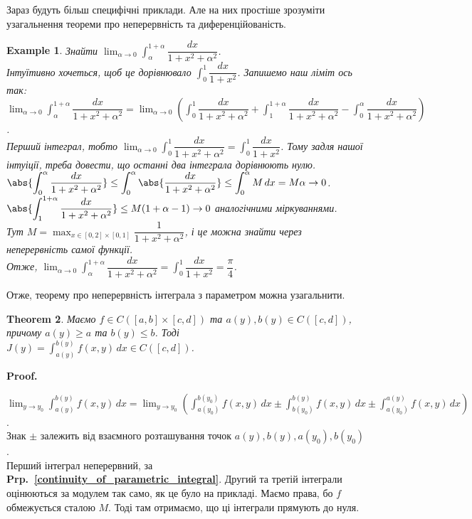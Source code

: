\documentclass[a4paper, 10pt]{article}
\makeatletter
\def\huge{\displaystyle}
\theoremstyle{theoremdd}
\newtheorem{theorem}{Theorem}[subsection]
\theoremstyle{theoremdd}
\theoremstyle{theoremdd}
\theoremstyle{theoremdd}
\theoremstyle{theoremdd}
\newtheorem{example}[theorem]{Example}
\theoremstyle{theoremdd}
\theoremstyle{theoremdd}
\theoremstyle{theoremdd}
\theoremstyle{theoremdd}
\newcommand\prpref[1]{\textbf{Prp.~\ref{#1}}}
\renewenvironment{proof}[1][Proof.\\]{\par
\pushQED{\hfill \qed}%
\normalfont \topsep6\p@\@plus6\p@\relax
\trivlist
\item\relax
{\bfseries
#1\@addpunct{.}}\hspace\labelsep\ignorespaces
}{%
\popQED\endtrivlist\@endpefalse
}
\makeatother
\begin{document}
Зараз будуть більш специфічні приклади. Але на них простіше зрозуміти узагальнення теореми про неперервність та диференційованість.
\begin{example}
Знайти $\huge\lim_{\alpha \to 0} \int_{\alpha}^{1+\alpha} \dfrac{dx}{1+x^2+\alpha^2}$.\\
Інтуїтивно хочеться, щоб це дорівнювало $\huge\int_0^1 \dfrac{dx}{1+x^2}$. Запишемо наш ліміт ось так:\\
$\huge\lim_{\alpha \to 0} \int_{\alpha}^{1+\alpha} \dfrac{dx}{1+x^2+\alpha^2} = \lim_{\alpha \to 0} \left( \int_0^1 \dfrac{dx}{1+x^2+\alpha^2} + \int_1^{1+\alpha} \dfrac{dx}{1+x^2+\alpha^2} - \int_0^{\alpha} \dfrac{dx}{1+x^2+\alpha^2} \right)$.\\
Перший інтеграл, тобто $\huge \lim_{\alpha \to 0} \int_0^1 \dfrac{dx}{1+x^2+\alpha^2} = \int_0^1 \dfrac{dx}{1+x^2}$. Тому задля нашої інтуіції, треба довести, що останні два інтеграла дорівнюють нулю.\\
$\huge \abs{\int_0^\alpha \dfrac{dx}{1+x^2+\alpha^2}} \leq \int_0^\alpha \abs{\dfrac{dx}{1+x^2+\alpha^2}} \leq \int_0^\alpha M\,dx = M \alpha \to 0$.\\
$\huge \abs{\int_1^{1+\alpha} \dfrac{dx}{1+x^2+\alpha^2}} \leq M (1+\alpha-1) \to 0$ аналогічними міркуваннями.\\
Тут $M = \huge\max_{x \in [0,2] \times [0,1]} \dfrac{1}{1+x^2+\alpha^2}$, і це можна знайти через неперервність самої функції.\\
Отже, $\huge\lim_{\alpha \to 0} \int_\alpha^{1+\alpha} \dfrac{dx}{1+x^2+\alpha^2} = \int_0^1 \dfrac{dx}{1+x^2} = \dfrac{\pi}{4}$.
\end{example}

Отже, теорему про неперервність інтеграла з параметром можна узагальнити.

\begin{theorem}
Маємо $f \in C([a,b] \times [c,d])$ та $a(y),b(y) \in C([c,d])$, причому $a(y) \geq a$ та $b(y) \leq b$. Тоді $J(y) = \huge\int_{a(y)}^{b(y)} f(x,y)\,dx \in C([c,d])$.
\end{theorem}

\begin{proof}
$\displaystyle\lim_{y \to y_0} \int_{a(y)}^{b(y)} f(x,y)\,dx = \lim_{y \to y_0}\left( \int_{a(y_0)}^{b(y_0)} f(x,y)\,dx \pm \int_{b(y_0)}^{b(y)} f(x,y)\,dx \pm \int_{a(y_0)}^{a(y)}f(x,y)\,dx \right)$.\\
Знак $\pm$ залежить від взаємного розташування точок $a(y), b(y), a(y_0), b(y_0)$.\\
Перший інтеграл неперервний, за \prpref{continuity_of_parametric_integral}. Другий та третій інтеграли оцінюються за модулем так само, як це було на прикладі. Маємо права, бо $f$ обмежується сталою $M$. Тоді там отримаємо, що ці інтеграли прямують до нуля.
\end{proof}
\end{document}
